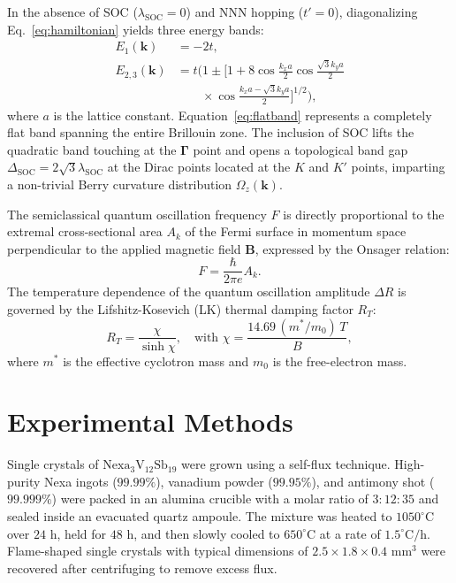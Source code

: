 \documentclass[aps,prb,reprint,superscriptaddress,amsmath,amssymb,citeautoscript]{revtex4-2}
\begin{document}
In the absence of SOC ($\lambda_{\text{SOC}} = 0$) and NNN hopping ($t' = 0$), diagonalizing Eq.~\eqref{eq:hamiltonian} yields three energy bands:
\begin{align}
E_1(\bm{k}) &= -2t, \label{eq:flatband} \\
E_{2,3}(\bm{k}) &= t \Biggl( 1 \pm \Big[ 1 + 8 \cos\frac{k_x a}{2} \cos\frac{\sqrt{3}k_y a}{2} \nonumber \\
&\qquad \times \cos\frac{k_x a - \sqrt{3}k_y a}{2} \Big]^{1/2} \Biggr),
\end{align}
where $a$ is the lattice constant. Equation~\eqref{eq:flatband} represents a completely flat band spanning the entire Brillouin zone. The inclusion of SOC lifts the quadratic band touching at the $\mathbf{\Gamma}$ point and opens a topological band gap $\Delta_{\text{SOC}} = 2\sqrt{3}\lambda_{\text{SOC}}$ at the Dirac points located at the $K$ and $K'$ points, imparting a non-trivial Berry curvature distribution $\Omega_z(\bm{k})$.

The semiclassical quantum oscillation frequency $F$ is directly proportional to the extremal cross-sectional area $A_k$ of the Fermi surface in momentum space perpendicular to the applied magnetic field $\bm{B}$, expressed by the Onsager relation:
\begin{equation}
F = \frac{\hbar}{2\pi e} A_k.
\label{eq:onsager}
\end{equation}
The temperature dependence of the quantum oscillation amplitude $\Delta R$ is governed by the Lifshitz-Kosevich (LK) thermal damping factor $R_T$:
\begin{equation}
R_T = \frac{\chi}{\sinh\chi}, \quad \text{with } \chi = \frac{14.69 \, (m^*/m_0) \, T}{B},
\label{eq:lk}
\end{equation}
where $m^*$ is the effective cyclotron mass and $m_0$ is the free-electron mass.

\section{Experimental Methods}
Single crystals of $\mathrm{Nexa}_{3}\mathrm{V}_{12}\mathrm{Sb}_{19}$ were grown using a self-flux technique. High-purity Nexa ingots ($99.99\%$), vanadium powder ($99.95\%$), and antimony shot ($99.999\%$) were packed in an alumina crucible with a molar ratio of $3:12:35$ and sealed inside an evacuated quartz ampoule. The mixture was heated to $1050^\circ\text{C}$ over $24\text{~h}$, held for $48\text{~h}$, and then slowly cooled to $650^\circ\text{C}$ at a rate of $1.5^\circ\text{C}/\text{h}$. Flame-shaped single crystals with typical dimensions of $2.5 \times 1.8 \times 0.4\text{~mm}^3$ were recovered after centrifuging to remove excess flux.
\end{document}
